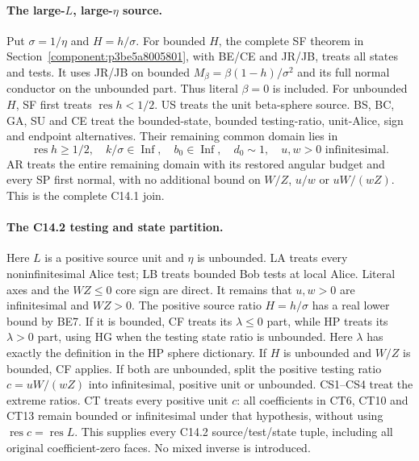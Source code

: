 \paragraph{The large-$L$, large-$\eta$ source.}
Put $\sigma=1/\eta$ and $H=h/\sigma$.  For bounded $H$,
the complete SF theorem in Section~\ref{component:p3be5a8005801}, with BE/CE and JR/JB, treats all
states and tests.  It uses JR/JB on bounded
$M_\beta=\beta(1-h)/\sigma^2$ and its full normal conductor
on the unbounded part.  Thus literal $\beta=0$ is included.
For unbounded $H$, SF first treats $\operatorname{res}h<1/2$.
US treats the unit beta-sphere source.  BS, BC, GA, SU and CE
treat the bounded-state, bounded testing-ratio, unit-Alice, sign
and endpoint alternatives.  Their remaining common domain lies in
\[
 \operatorname{res}h\ge1/2,\quad k/\sigma\in\operatorname{Inf},
 \quad b_0\in\operatorname{Inf},\quad d_0\sim1,
 \quad u,w>0\text{ infinitesimal}.                        \tag{JC5}
\]
AR treats the entire remaining domain with its restored angular
budget and every SP first normal, with no additional bound on
$W/Z$, $u/w$ or $uW/(wZ)$.  This is the complete C14.1 join.

\paragraph{The C14.2 testing and state partition.}
Here $L$ is a positive source unit and $\eta$ is unbounded.
LA treats every noninfinitesimal Alice test; LB treats bounded Bob
tests at local Alice.  Literal axes and the $WZ\le0$ core sign
are direct.  It remains that $u,w>0$ are infinitesimal and
$WZ>0$.  The positive source ratio $H=h/\sigma$ has a real
lower bound by BE7.  If it is bounded, CF treats its
$\lambda\le0$ part, while HP treats its $\lambda>0$ part,
using HG when the testing state ratio is unbounded.  Here
$\lambda$ has exactly the definition in the HP sphere dictionary.
If $H$ is unbounded and $W/Z$ is bounded, CF applies.
If both are unbounded, split the positive testing ratio
$c=uW/(wZ)$ into infinitesimal, positive unit or unbounded.
CS1--CS4 treat the extreme ratios.  CT treats every positive unit
$c$: all coefficients in CT6, CT10 and CT13 remain bounded or
infinitesimal under that hypothesis, without using
$\operatorname{res}c=\operatorname{res}L$.
This supplies every C14.2 source/test/state tuple, including all
original coefficient-zero faces.  No mixed inverse is introduced.

